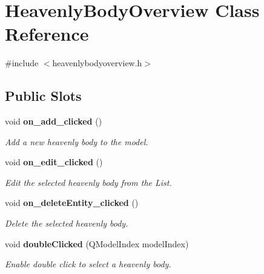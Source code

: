 \section{\-Heavenly\-Body\-Overview \-Class \-Reference}
\label{d9/d59/classHeavenlyBodyOverview}


{\ttfamily \#include $<$heavenlybodyoverview.\-h$>$}

\subsection*{\-Public \-Slots}
\begin{DoxyCompactItemize}
\item 
void {\bf on\-\_\-add\-\_\-clicked} ()\label{d9/d59/classHeavenlyBodyOverview_ad23b61bfb27f1b479eb965c84af55462}

\begin{DoxyCompactList}\small\item\em \-Add a new heavenly body to the model. \end{DoxyCompactList}\item 
void {\bf on\-\_\-edit\-\_\-clicked} ()\label{d9/d59/classHeavenlyBodyOverview_a1bf8ee9ed5de9b020979f2cffde51e97}

\begin{DoxyCompactList}\small\item\em \-Edit the selected heavenly body from the \-List. \end{DoxyCompactList}\item 
void {\bf on\-\_\-delete\-Entity\-\_\-clicked} ()\label{d9/d59/classHeavenlyBodyOverview_a280498f7189f4c6578803120028c3fb7}

\begin{DoxyCompactList}\small\item\em \-Delete the selected heavenly body. \end{DoxyCompactList}\item 
void {\bf double\-Clicked} (\-Q\-Model\-Index model\-Index)
\begin{DoxyCompactList}\small\item\em \-Enable double click to select a heavenly body. \end{DoxyCompactList}\end{DoxyCompactItemize}
